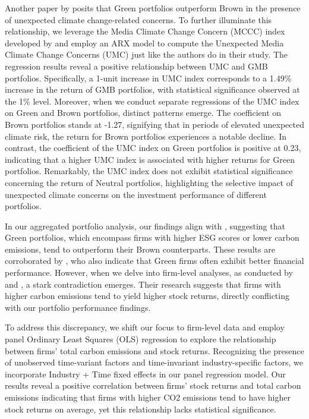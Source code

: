 \documentclass[12pt]{article}
\begin{document}
Another paper by \cite{pastor2021sustainable} posits that Green portfolios outperform Brown in the presence of unexpected climate change-related concerns. To further illuminate this relationship, we leverage the Media Climate Change Concern (MCCC) index developed by \cite{ardia2022climate} and employ an ARX model to compute the Unexpected Media Climate Change Concerns (UMC) just like the authors do in their study. The regression results reveal a positive relationship between UMC and GMB portfolios. Specifically, a 1-unit increase in UMC index corresponds to a 1.49\% increase in the return of GMB portfolios, with statistical significance observed at the 1\% level. Moreover, when we conduct separate regressions of the UMC index on Green and Brown portfolios, distinct patterns emerge. The coefficient on Brown portfolios stands at -1.27, signifying that in periods of elevated unexpected climate risk, the return for Brown portfolios experiences a notable decline. In contrast, the coefficient of the UMC index on Green portfolios is positive at 0.23, indicating that a higher UMC index is associated with higher returns for Green portfolios. Remarkably, the UMC index does not exhibit statistical significance concerning the return of Neutral portfolios, highlighting the selective impact of unexpected climate concerns on the investment performance of different portfolios.

In our aggregated portfolio analysis, our findings align with \cite{pastor2022dissecting}, suggesting that Green portfolios, which encompass firms with higher ESG scores or lower carbon emissions, tend to outperform their Brown counterparts. These results are corroborated by \cite{friede2015esg}, who also indicate that Green firms often exhibit better financial performance. However, when we delve into firm-level analyses, as conducted by \cite{bolton2021investors} and \cite{aswani2023carbon}, a stark contradiction emerges. Their research suggests that firms with higher carbon emissions tend to yield higher stock returns, directly conflicting with our portfolio performance findings.

To address this discrepancy, we shift our focus to firm-level data and employ panel Ordinary Least Squares (OLS) regression to explore the relationship between firms' total carbon emissions and stock returns. Recognizing the presence of unobserved time-variant factors and time-invariant industry-specific factors, we incorporate Industry + Time fixed effects in our panel regression model. Our results reveal a positive correlation between firms' stock returns and total carbon emissions indicating that firms with higher CO2 emissions tend to have higher stock returns on average, yet this relationship lacks statistical significance. 
\end{document}
